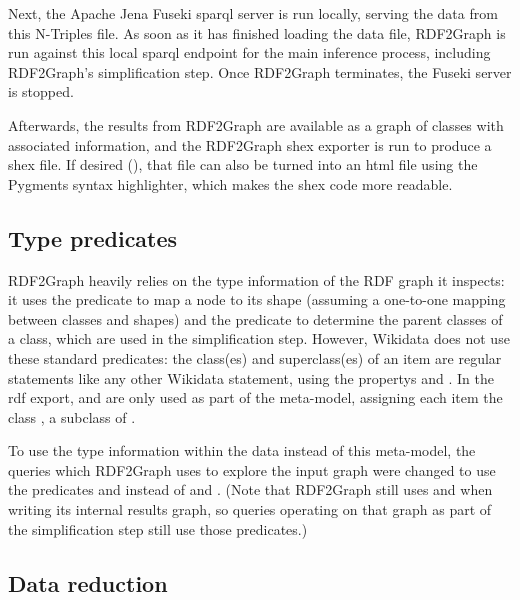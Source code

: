 Next, the Apache Jena Fuseki \gls{sparql} server is run locally,
serving the data from this \gls{N-Triples} file.
As soon as it has finished loading the data file,
\gls{RDF2Graph} is run against this local \gls{sparql} endpoint for the main inference process,
including \gls{RDF2Graph}’s simplification step.
Once \gls{RDF2Graph} terminates, the Fuseki server is stopped.

Afterwards, the results from \gls{RDF2Graph} are available as a graph of classes with associated information,
and the \gls{RDF2Graph} \gls{shex} exporter is run to produce a \gls{shex} file.
If desired (),
that file can also be turned into an \gls{html} file using the Pygments syntax highlighter,
which makes the \gls{shex} code more readable.

\subsection{Type predicates}
\label{subsec:RDF2Graph+Wikidata:Wikidata:predicates}

\Gls{RDF2Graph} heavily relies on the type information of the RDF graph it inspects:
it uses the  \gls{predicate} to map a node to its \gls{shape}
(assuming a one-to-one mapping between classes and \glspl{shape})
and the  \gls{predicate} to determine the parent classes of a class,
which are used in the simplification step.
However, \gls{Wikidata} does not use these standard \glspl{predicate}:
the class(es) and superclass(es) of an item
are regular \glspl{statement} like any other \gls{Wikidata} \gls{statement},
using the \glspl{property}  and .
In the \gls{rdf} export,  and  are only used
as part of the meta-model, %
assigning each item the class , a subclass of .

To use the type information within the data instead of this meta-model,
the queries which \gls{RDF2Graph} uses to explore the input graph
were changed to use the \glspl{predicate}  and 
instead of  and .
(Note that \gls{RDF2Graph} still uses  and 
when writing its internal results graph,
so queries operating on that graph as part of the simplification step
still use those \glspl{predicate}.)

\subsection{Data reduction}
\label{subsec:RDF2Graph+Wikidata:Wikidata:reduction}

